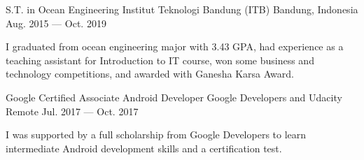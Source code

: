 

\begin{cventries}

  \cventry
    {S.T. in Ocean Engineering} %
    {Institut Teknologi Bandung (ITB)} %
    {Bandung, Indonesia} %
    {Aug. 2015 --- Oct. 2019} %
    {
      \begin{cvitems} %
        {I graduated from ocean engineering major with 3.43 GPA, had experience as a teaching assistant for Introduction to IT course, won some business
        and technology competitions, and awarded with Ganesha Karsa Award.}
      \end{cvitems}
    }

  \cventry
    {Google Certified Associate Android Developer} %
    {Google Developers and Udacity} %
    {Remote} %
    {Jul. 2017 --- Oct. 2017} %
    {
      \begin{cvitems} %
        {I was supported by a full scholarship from Google Developers to learn intermediate Android development skills and a certification test.}
      \end{cvitems}
    }

\end{cventries}
